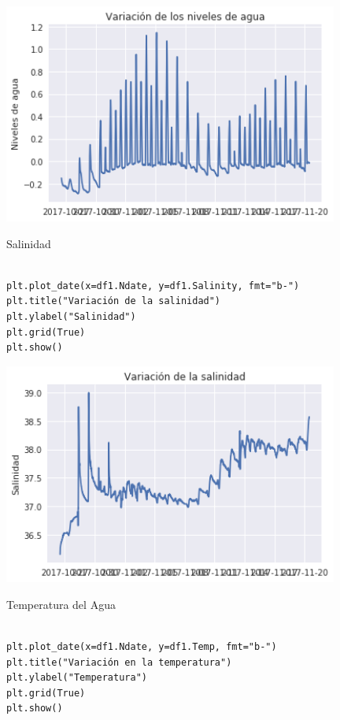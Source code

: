 \documentclass{article} %
\begin{document}
\begin{center}
 	\includegraphics[width=11cm]{wat.png}
 \end{center}

Salinidad

\begin{verbatim} 

plt.plot_date(x=df1.Ndate, y=df1.Salinity, fmt="b-")
plt.title("Variación de la salinidad")
plt.ylabel("Salinidad")
plt.grid(True)
plt.show()

\end{verbatim}

\begin{center}
 	\includegraphics[width=11cm]{salit.png}
 \end{center}

Temperatura del Agua

\begin{verbatim} 

plt.plot_date(x=df1.Ndate, y=df1.Temp, fmt="b-")
plt.title("Variación en la temperatura")
plt.ylabel("Temperatura")
plt.grid(True)
plt.show()

\end{verbatim}
\end{document}
